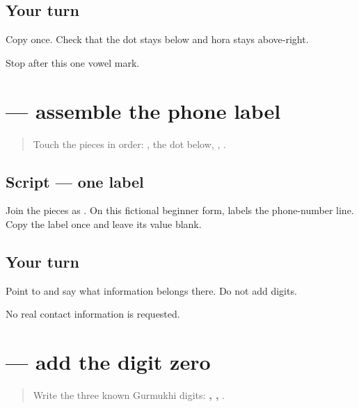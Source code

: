 \subsection*{Your turn}
Copy \textbf{} once. Check that the dot stays below and hora stays above-right.

\begin{tcolorbox}[breakable,colback=teal!4,colframe=teal!35!black,title={Before you move on}]
Stop after this one vowel mark.
\end{tcolorbox}
\section[\texorpdfstring{\pa{ਫ਼ੋਨ} (fon)}{ਫ਼ੋਨ (fon)}]{ — assemble the phone label}

\label{lesson:PA-W08-phone-label}



\begin{quote}
Touch the pieces in order: \textbf{}, the dot below, \textbf{}, \textbf{}.
\end{quote}

\subsection*{Script — one label}
Join the pieces as \textbf{}. On this fictional beginner form, \textbf{} labels the phone-number line. Copy the label once and leave its value blank.

\subsection*{Your turn}
Point to \textbf{} and say what information belongs there. Do not add digits.

\begin{tcolorbox}[breakable,colback=teal!4,colframe=teal!35!black,title={Before you move on}]
No real contact information is requested.
\end{tcolorbox}
\section[\texorpdfstring{\pa{੦} (zero)}{੦ (zero)}]{ — add the digit zero}

\label{lesson:PA-W08-digit-zero}



\begin{quote}
Write the three known Gurmukhi digits: \textbf{, , }.
\end{quote}


